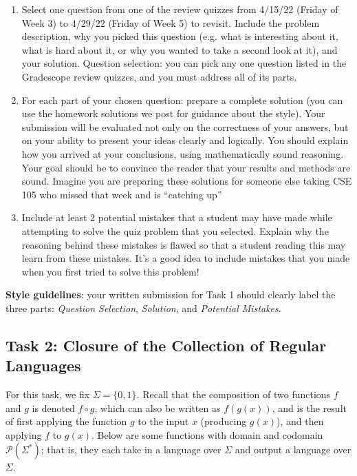 	\begin{enumerate}
		\item Select one question from one of the review quizzes from 4/15/22 (Friday of Week 3) to 4/29/22  (Friday of Week 5) to revisit. Include the problem description, why you picked this question (e.g. what is interesting about it, what is hard about it, or why you wanted to take a second look at it), and your solution. Question selection: you can pick any one question listed in the Gradescope review quizzes, and you must address  all  of its parts. 
 		\item For each part of your chosen question: prepare a complete solution (you can use the homework solutions we post for guidance about the style). Your submission will be evaluated not only on the correctness of your answers, but on your ability to present your ideas clearly and logically. You should explain how you arrived at your conclusions, using mathematically sound reasoning. Your goal should be to convince the reader that your results and methods are sound. Imagine you are preparing these solutions for someone else taking CSE 105 who missed that week and is “catching up”
 
 		\item Include at least 2 potential mistakes that a student may have made while attempting to solve the quiz problem that you selected. Explain why the reasoning behind these mistakes is flawed so that a student reading this may learn from these mistakes. It’s a good idea to include mistakes that you made when you first tried to solve this problem!	
	\end{enumerate}
	
	{\bf Style guidelines}: your written submission for Task 1 should clearly label the three parts:
	{\it Question Selection}, {\it Solution},  and {\it Potential Mistakes}.

\newpage
\subsection{Task 2: Closure of the Collection of Regular Languages}
	
	For this task, we fix $\Sigma = \{0,1\}$. Recall that the composition of two 
	functions $f$ and $g$ is denoted $f \circ g$, which can also be written as $f(g(x))$, and is the 
	result of first applying the function $g$ to the input $x$ (producing $g(x)$), and then applying $f$ to $g(x)$. 
	Below are some functions with domain and codomain $\mathcal{P}(\Sigma^*)$; that is, they 
	each take in a language over $\Sigma$
	and output a language over $\Sigma$. 
	
